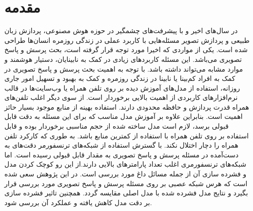 \chapter{مقدمه}
\thispagestyle{empty}
	در سال‌های اخیر و با پیشرفت‌های چشمگیر در حوزه هوش مصنوعی، پردازش زبان طبیعی و پردازش تصویر مسئله‌هایی با کاربرد عملی در زندگی روزمره انسان‌ها طراحی شده است. یکی از مواردی که اخیرا مورد توجه قرار گرفته است، بحث پرسش و پاسخ تصویری می‌باشد. این مسئله کاربرد‌‌‌های زیادی در کمک به نابینایان، دستیار هوشمند و موارد مشابه می‌تواند داشته باشد.	  
\newline
با توجه به اهمیت بحث پرسش و پاسخ تصویری در کمک به افراد کم‌بینا یا نابینا در زندگی روزمره و کمک به بهبود و تسهیل امور جاری روزانه، استفاده از مدل‌های آموزش دیده بر روی تلفن همراه یا وب‌سایت‌ها در قالب نرم‌افزار‌های کاربردی از اهمیت بالایی برخوردار است. از سوی دیگر اغلب تلفن‌های همراه قدرت پردازش و حافظه محدودی دارند. استفاده بهینه از منابع موجود بسیار حائز اهمیت است. بنابراین علاوه بر آموزش مدل مناسب که برای این مسئله به دقت قابل قبولی برسد، لازم است مدل ساخته شده از حجم مناسبی برخوردار بوده و قابل استفاده بر روی تلفن همراه با استفاده از کمترین منابع باشد. به طوری که کارکرد تلفن همراه را دچار اختلال نکند. 
\newline	 
با گسترش استفاده از شبکه‌های ترنسفورمر دقت‌های به دست‌آمده در مسئله پرسش و پاسخ تصویری به مقدار قابل قبولی رسیده است. اما شبکه‌های ترنسفورمری اغلب تعداد پارامتر‌های بالایی دارند.از این رو کوچک کردن مدل و فشرده سازی آن از جمله مسائل داغ مورد بررسی است.
در این پژوهش سعی شده است که هرس شبکه عصبی بر روی مسئله پرسش و پاسخ تصویری مورد بررسی قرار بگیرد و نتایج مدل فشرده شده با مدل اصلی مقایسه گردد. همچنین تاثیر فشرده سازی بر دقت مدل کاهش یافته و عملکرد آن بررسی ‌شود.

